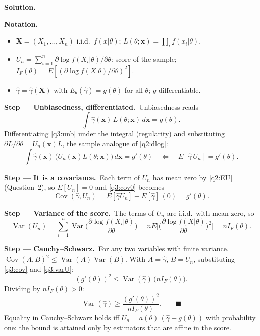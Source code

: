 \documentclass[11pt,a4paper]{article}
\numberwithin{equation}{questao}   %
\newenvironment{notacao}{\par\smallskip\noindent\textbf{Notation.}\begin{itemize}[leftmargin=1.4em,topsep=1pt,itemsep=0pt]\small}{\end{itemize}}
\newcommand{\passo}[2]{\par\smallskip\noindent\textbf{Step --- #1.}~#2}
\newcommand{\solhead}{\par\medskip\noindent{\color{blue!55!black}\rule{\linewidth}{0.3pt}}\par\noindent\textbf{Solution.}}
\newcommand{\Var}{\operatorname{Var}}
\newcommand{\Cov}{\operatorname{Cov}}
\newcommand{\1}{\mathbf{1}}
\begin{document}
\begin{sol}
\solhead
\begin{notacao}
\item $\mathbf X=(X_1,\dots,X_n)$ i.i.d.\ $f(x|\theta)$; $L(\theta;\mathbf x)=\prod_if(x_i|\theta)$.
\item $U_n=\sum_{i=1}^n\partial\log f(X_i|\theta)/\partial\theta$: score of the sample;
  $I_F(\theta)=E[(\partial\log f(X|\theta)/\partial\theta)^2]$.
\item $\hat\gamma=\hat\gamma(\mathbf X)$ with $E_\theta(\hat\gamma)=g(\theta)$ for all $\theta$; $g$ differentiable.
\end{notacao}

\passo{Unbiasedness, differentiated}{Unbiasedness reads}
\begin{equation}\label{q3:unb}
\int\hat\gamma(\mathbf x)\,L(\theta;\mathbf x)\,d\mathbf x=g(\theta).
\end{equation}
Differentiating \eqref{q3:unb} under the integral (regularity) and substituting
$\partial L/\partial\theta=U_n(\mathbf x)L$, the sample analogue of \eqref{q2:dlog}:
\begin{equation}\label{q3:cov0}
\int\hat\gamma(\mathbf x)\,\big(U_n(\mathbf x)L(\theta;\mathbf x)\big)\,d\mathbf x=g'(\theta)
\quad\Longleftrightarrow\quad E[\hat\gamma\,U_n]=g'(\theta).
\end{equation}

\passo{It is a covariance}{Each term of $U_n$ has mean zero by \eqref{q2:EU} (Question~2), so
$E[U_n]=0$ and \eqref{q3:cov0} becomes}
\begin{equation}\label{q3:cov}
\Cov(\hat\gamma,U_n)=E[\hat\gamma U_n]-E[\hat\gamma]\,(0)=g'(\theta).
\end{equation}

\passo{Variance of the score}{The terms of $U_n$ are i.i.d.\ with mean zero, so}
\begin{equation}\label{q3:varU}
\Var(U_n)=\sum_{i=1}^n\Var\Big(\frac{\partial\log f(X_i|\theta)}{\partial\theta}\Big)=nE\Big[\Big(\frac{\partial\log f(X|\theta)}{\partial\theta}\Big)^2\Big]=nI_F(\theta).
\end{equation}

\passo{Cauchy--Schwarz}{For any two variables with finite variance,
$\Cov(A,B)^2\le\Var(A)\Var(B)$. With $A=\hat\gamma$, $B=U_n$, substituting \eqref{q3:cov} and
\eqref{q3:varU}:}
\[
(g'(\theta))^2\le\Var(\hat\gamma)\,\big(nI_F(\theta)\big).
\]
Dividing by $nI_F(\theta)>0$:
\begin{equation}\label{q3:CR}
\Var(\hat\gamma)\ge\frac{(g'(\theta))^2}{nI_F(\theta)} .\qquad\blacksquare
\end{equation}
Equality in Cauchy--Schwarz holds iff $U_n=a(\theta)\,(\hat\gamma-g(\theta))$ with probability one:
the bound is attained only by estimators that are affine in the score.


\end{sol}
\end{document}
